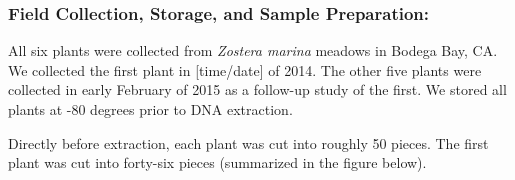 
\subsubsection{Field Collection, Storage, and Sample Preparation:}

All six plants were collected from \textit{Zostera marina} meadows in Bodega Bay, CA. We collected the first plant in [time/date] of 2014. The other five plants were collected in early February of 2015 as a follow-up study of the first. We stored all plants at -80 degrees prior to DNA extraction. 

Directly before extraction, each plant was cut into roughly 50 pieces. The first plant was cut into forty-six pieces (summarized in the figure below). 

    
    
    